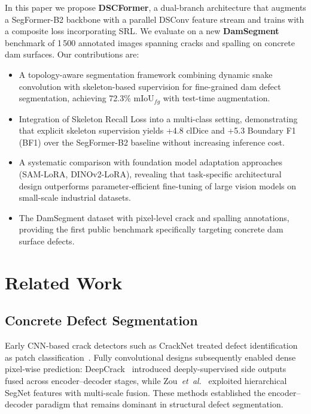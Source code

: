 In this paper we propose \textbf{DSCFormer}, a dual-branch architecture that augments a SegFormer-B2 backbone with a parallel DSConv feature stream and trains with a composite loss incorporating SRL.
We evaluate on a new \textbf{DamSegment} benchmark of 1\,500 annotated images spanning cracks and spalling on concrete dam surfaces.
Our contributions are:
\begin{itemize}
    \item A topology-aware segmentation framework combining dynamic snake convolution with skeleton-based supervision for fine-grained dam defect segmentation, achieving 72.3\% mIoU$_{fg}$ with test-time augmentation.
    \item Integration of Skeleton Recall Loss into a multi-class setting, demonstrating that explicit skeleton supervision yields +4.8 clDice and +5.3 Boundary F1 (BF1) over the SegFormer-B2 baseline without increasing inference cost.
    \item A systematic comparison with foundation model adaptation approaches (SAM-LoRA, DINOv2-LoRA), revealing that task-specific architectural design outperforms parameter-efficient fine-tuning of large vision models on small-scale industrial datasets.
    \item The DamSegment dataset with pixel-level crack and spalling annotations, providing the first public benchmark specifically targeting concrete dam surface defects.
\end{itemize}

\section{Related Work}
\label{sec:related}

\subsection{Concrete Defect Segmentation}
\label{sec:related:defect}

Early CNN-based crack detectors such as CrackNet treated defect identification as patch classification~\cite{zou2019deepcrack}.
Fully convolutional designs subsequently enabled dense pixel-wise prediction: DeepCrack~\cite{liu2019deepcrack} introduced deeply-supervised side outputs fused across encoder--decoder stages, while Zou~\emph{et~al.}~\cite{zou2019deepcrack} exploited hierarchical SegNet features with multi-scale fusion.
These methods established the encoder--decoder paradigm that remains dominant in structural defect segmentation.

